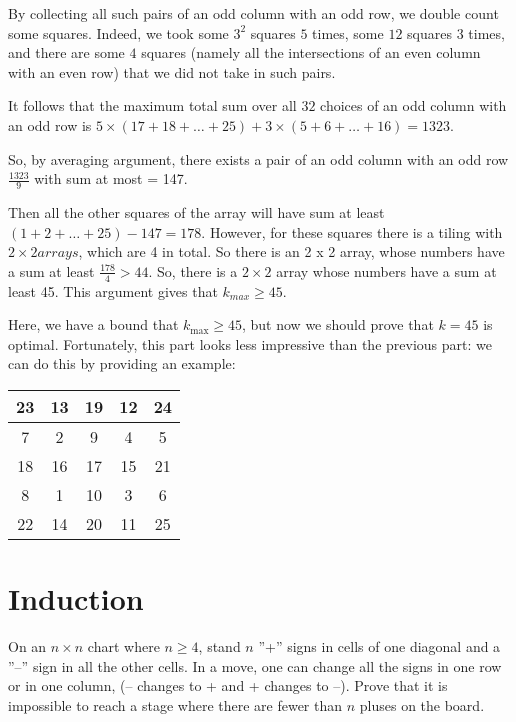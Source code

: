 By collecting all such pairs of an odd column with an odd row, we double count some squares. Indeed, we took some $3^2$ squares $5$ times, some $12$ squares $3$ times, and there are some $4$ squares (namely all the intersections of an even column with an even row) that we did not take in such pairs.

It follows that the maximum total sum over all $32$ choices of an odd column with an odd row is $5\times (17+18+\dots +25) + 3 \times (5+6+ \dots +16) = 1323$.

So, by averaging argument, there exists a pair of an odd column with an odd row $\frac{1323}{9}$ with sum at most = 147. 

Then all the other squares of the array will have sum at least $(1+2+ \dots +25)-147=178$. However, for these squares there is a tiling with $2 \times 2 arrays$, which are 4 in total. So there is an 2 x 2 array, whose numbers have a sum at least $\frac{178}{4} > 44$. So, there is a $2 \times 2$ array whose numbers have a sum at least 45. This argument gives that $k_{max} \geq 45$.

Here, we have a bound that $k_{\text{max}} \geq 45$, but now we should prove that $k=45$ is optimal. Fortunately, this part looks less impressive than the previous part: we can do this by providing an example:

\renewcommand{\arraystretch}{1.5}
\begin{center}
    \begin{tabular}{|c|c|c|c|c|}
        \hline
        23 & 13 & 19 & 12 & 24 \\
        \hline
        7 & 2 & 9 & 4 & 5 \\
        \hline
        18 & 16 & 17 & 15 & 21 \\
        \hline
        8 & 1 & 10 & 3 & 6 \\
        \hline
        22 & 14 & 20 & 11 & 25\\
        \hline
    \end{tabular}
\end{center}
\renewcommand{\arraystretch}{1}

\section{Induction}

\begin{example}
    On an $n\times n$ chart where $n\geq 4$, stand $n$ ''+'' signs in cells of one diagonal and a ''--'' sign in all the other cells. In a move, one can change all the signs in one row or in one column, (-- changes to + and + changes to --). Prove that it is impossible to reach a stage where there are fewer than $n$ pluses on the board.
\end{example}

